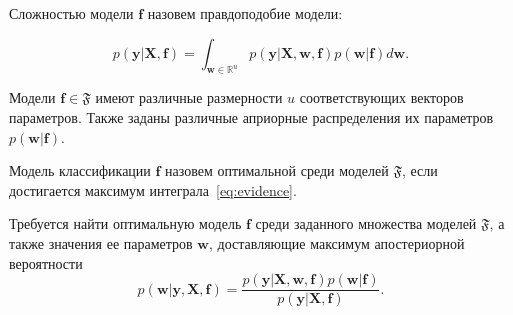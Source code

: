 \documentclass[12pt]{a&t}
\begin{document}
\begin{definition} Сложностью модели $\mathbf{f}$ назовем правдоподобие модели: %

\begin{equation}
\label{eq:evidence}
	p(\mathbf{y}|\mathbf{X},\mathbf{f}) = \int_{\mathbf{w} \in \mathbb{R}^u} p(\mathbf{y}|\mathbf{X},\mathbf{w}, \mathbf{f})p(\mathbf{w}|\mathbf{f})d\mathbf{w}.
\end{equation}
\end{definition}
Модели $\mathbf{f} \in \mathfrak{F}$ имеют различные размерности $u$ соответствующих векторов параметров. Также заданы различные априорные распределения их параметров $p(\mathbf{w}|\mathbf{f})$.


\begin{definition}Модель классификации $\mathbf{f}$ назовем оптимальной среди моделей $\mathfrak{F}$, если достигается максимум интеграла~\eqref{eq:evidence}.
\end{definition}


Требуется найти оптимальную модель $\mathbf{f}$ среди заданного множества моделей $\mathfrak{F}$, а также значения ее параметров $\mathbf{w}$, доставляющие максимум апостериорной вероятности
\begin{equation}
\label{eq:posterior}
	p(\mathbf{w}|\mathbf{y},\mathbf{X},\mathbf{f}) = \frac{p(\mathbf{y}|\mathbf{X}, \mathbf{w}, \mathbf{f})p(\mathbf{w}|\mathbf{f})}{p(\mathbf{y}|\mathbf{X}, \mathbf{f})}.
\end{equation}
\end{document}
